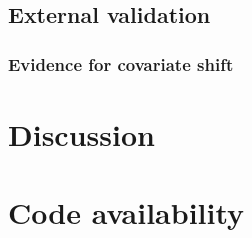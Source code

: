 \subsection{External validation}

\subsubsection{Evidence for covariate shift}

\section{Discussion}



\section{Code availability}